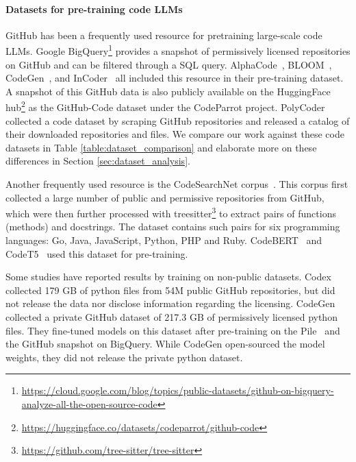\paragraph{Datasets for pre-training code LLMs} GitHub has been a frequently used resource for pretraining large-scale code LLMs. Google BigQuery\footnote{\url{https://cloud.google.com/blog/topics/public-datasets/github-on-bigquery-analyze-all-the-open-source-code}} provides a snapshot of permissively licensed repositories on GitHub and can be filtered through a SQL query. AlphaCode~\citep{li2022competition}, BLOOM~\citep{laurencon2022roots}, CodeGen~\citep{Nijkamp2022ACP}, and InCoder~\citep{fried2022incoder} all included this resource in their pre-training dataset. A snapshot of this GitHub data is also publicly available on the HuggingFace hub\footnote{\url{https://huggingface.co/datasets/codeparrot/github-code}} as the GitHub-Code dataset under the CodeParrot project. PolyCoder~\citep{xu2022systematicevaluation} collected a code dataset by scraping GitHub repositories and released a catalog of their downloaded repositories and files. We compare our work against these code datasets in Table \ref{table:dataset_comparison} and elaborate more on these differences in Section \ref{sec:dataset_analysis}. 

Another frequently used resource is the CodeSearchNet corpus~\citep{husain2019codesearchnet}. This corpus first collected a large number of public and permissive repositories from GitHub, which were then further processed with treesitter\footnote{\url{https://github.com/tree-sitter/tree-sitter}} to extract pairs of functions (methods) and docstrings. The dataset contains such pairs for six programming languages: Go, Java, JavaScript, Python, PHP and Ruby. CodeBERT~\citep{feng-etal-2020-codebert} and CodeT5~\citep{wang-etal-2021-codet5} used this dataset for pre-training. 

Some studies have reported results by training on non-public datasets. Codex~\citep{chen2021codex} collected 179 GB of python files from 54M public GitHub repositories, but did not release the data nor disclose information regarding the licensing. CodeGen collected a private GitHub dataset of 217.3 GB of permissively licensed python files. They fine-tuned models on this dataset after pre-training on the Pile~\citep{gao2020pile} and the GitHub snapshot on BigQuery. While CodeGen open-sourced the model weights, they did not release the private python dataset.   

